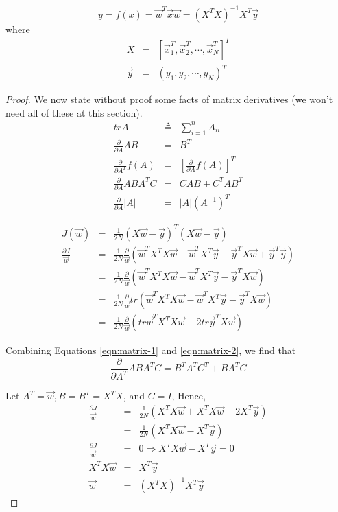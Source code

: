 \begin{equation}
y=f(x)=\vec{w}^T\vec{x} \vec{w}=(X^TX)^{-1}X^T\vec{y}
\end{equation}
where
\begin{eqnarray*}
X &=& \left[\vec{x}_1^T,\vec{x}_2^T,\cdots,\vec{x}_N^T\right]^T \\
\vec{y} &=& (y_1,y_2,\cdots,y_N)^T
\end{eqnarray*}


\begin{proof}
We now state without proof some facts of matrix derivatives (we won’t need all of these at this section).
\begin{eqnarray}
trA &\triangleq& \sum\limits_{i=1}^n A_{ii} \nonumber \\
\frac{\partial}{\partial A}AB &=& B^T \\
\frac{\partial}{\partial A^T}f(A) &=& \left[\frac{\partial}{\partial A}f(A)\right]^T \label{eqn:matrix-1} \\
\frac{\partial}{\partial A}ABA^TC &=& CAB+C^TAB^T \label{eqn:matrix-2} \\
\frac{\partial}{\partial A}|A| &=& |A|(A^{-1})^T
\end{eqnarray}

\begin{eqnarray*}
J(\vec{w}) &=& \frac{1}{2N}(X\vec{w}-\vec{y})^T(X\vec{w}-\vec{y}) \\
\frac{\partial J}{\vec{w}} &=& \frac{1}{2N} \frac{\partial}{\vec{w}} (\vec{w}^TX^TX\vec{w}-\vec{w}^TX^T\vec{y}-\vec{y}^TX\vec{w}+\vec{y}^T\vec{y}) \\
                           &=& \frac{1}{2N} \frac{\partial}{\vec{w}} (\vec{w}^TX^TX\vec{w}-\vec{w}^TX^T\vec{y}-\vec{y}^TX\vec{w}) \\
						   &=& \frac{1}{2N} \frac{\partial}{\vec{w}} tr(\vec{w}^TX^TX\vec{w}-\vec{w}^TX^T\vec{y}-\vec{y}^TX\vec{w}) \\
						   &=& \frac{1}{2N} \frac{\partial}{\vec{w}} (tr\vec{w}^TX^TX\vec{w}-2tr\vec{y}^TX\vec{w})
\end{eqnarray*}

Combining Equations \eqref{eqn:matrix-1} and \eqref{eqn:matrix-2}, we find that 
\begin{equation*}
\frac{\partial}{\partial A^T}ABA^TC = B^TA^TC^T+BA^TC
\end{equation*}

Let $A^T=\vec{w}, B=B^T=X^TX$, and $C=I$, Hence,
\begin{eqnarray*}
\frac{\partial J}{\vec{w}} &=& \frac{1}{2N} (X^TX\vec{w}+X^TX\vec{w} -2X^T\vec{y}) \\
						   &=& \frac{1}{2N} (X^TX\vec{w} - X^T\vec{y}) \\
\frac{\partial J}{\vec{w}} &=& 0 \Rightarrow X^TX\vec{w} - X^T\vec{y} =0 \\
X^TX\vec{w} &=& X^T\vec{y} \\
\vec{w} &=& (X^TX)^{-1}X^T\vec{y}
\end{eqnarray*}
\end{proof}


